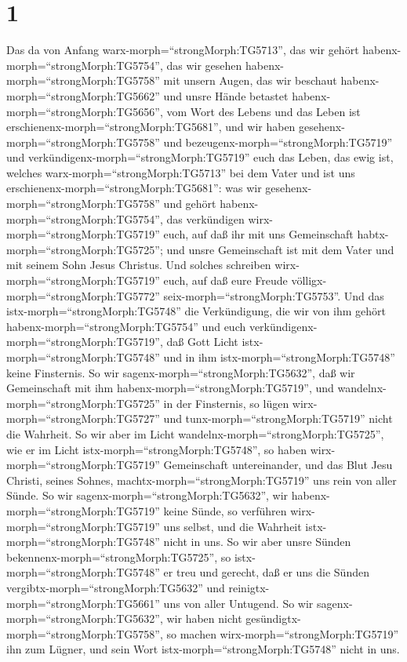 \hypertarget{section}{%
\section{1}\label{section}}

 Das da von Anfang warx-morph=``strongMorph:TG5713'', das
wir gehört habenx-morph=``strongMorph:TG5754'', das wir gesehen
habenx-morph=``strongMorph:TG5758'' mit unsern Augen, das wir beschaut
habenx-morph=``strongMorph:TG5662'' und unsre Hände betastet
habenx-morph=``strongMorph:TG5656'', vom Wort des Lebens 
und das Leben ist erschienenx-morph=``strongMorph:TG5681'', und wir
haben gesehenx-morph=``strongMorph:TG5758'' und
bezeugenx-morph=``strongMorph:TG5719'' und
verkündigenx-morph=``strongMorph:TG5719'' euch das Leben, das ewig ist,
welches warx-morph=``strongMorph:TG5713'' bei dem Vater und ist uns
erschienenx-morph=``strongMorph:TG5681'':  was wir
gesehenx-morph=``strongMorph:TG5758'' und gehört
habenx-morph=``strongMorph:TG5754'', das verkündigen
wirx-morph=``strongMorph:TG5719'' euch, auf daß ihr mit uns Gemeinschaft
habtx-morph=``strongMorph:TG5725''; und unsre Gemeinschaft ist mit dem
Vater und mit seinem Sohn Jesus Christus.  Und solches
schreiben wirx-morph=``strongMorph:TG5719'' euch, auf daß eure Freude
völligx-morph=``strongMorph:TG5772'' seix-morph=``strongMorph:TG5753''.
 Und das istx-morph=``strongMorph:TG5748'' die Verkündigung,
die wir von ihm gehört habenx-morph=``strongMorph:TG5754'' und euch
verkündigenx-morph=``strongMorph:TG5719'', daß Gott Licht
istx-morph=``strongMorph:TG5748'' und in ihm
istx-morph=``strongMorph:TG5748'' keine Finsternis.  So wir
sagenx-morph=``strongMorph:TG5632'', daß wir Gemeinschaft mit ihm
habenx-morph=``strongMorph:TG5719'', und
wandelnx-morph=``strongMorph:TG5725'' in der Finsternis, so lügen
wirx-morph=``strongMorph:TG5727'' und tunx-morph=``strongMorph:TG5719''
nicht die Wahrheit.  So wir aber im Licht
wandelnx-morph=``strongMorph:TG5725'', wie er im Licht
istx-morph=``strongMorph:TG5748'', so haben
wirx-morph=``strongMorph:TG5719'' Gemeinschaft untereinander, und das
Blut Jesu Christi, seines Sohnes, machtx-morph=``strongMorph:TG5719''
uns rein von aller Sünde.  So wir
sagenx-morph=``strongMorph:TG5632'', wir
habenx-morph=``strongMorph:TG5719'' keine Sünde, so verführen
wirx-morph=``strongMorph:TG5719'' uns selbst, und die Wahrheit
istx-morph=``strongMorph:TG5748'' nicht in uns.  So wir aber
unsre Sünden bekennenx-morph=``strongMorph:TG5725'', so
istx-morph=``strongMorph:TG5748'' er treu und gerecht, daß er uns die
Sünden vergibtx-morph=``strongMorph:TG5632'' und
reinigtx-morph=``strongMorph:TG5661'' uns von aller Untugend.
 So wir sagenx-morph=``strongMorph:TG5632'', wir haben
nicht gesündigtx-morph=``strongMorph:TG5758'', so machen
wirx-morph=``strongMorph:TG5719'' ihn zum Lügner, und sein Wort
istx-morph=``strongMorph:TG5748'' nicht in uns.

